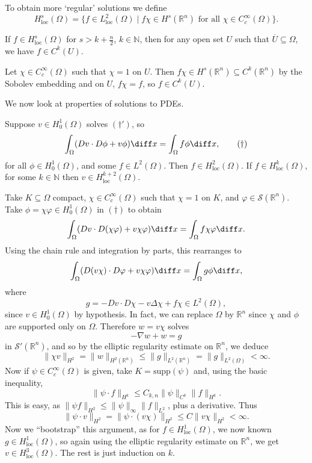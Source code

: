 \documentclass[12pt]{article}
\begin{document}
To obtain more `regular' solutions we define
\[
	H^s_{\mathrm{loc}}(\Omega) = \{f \in L^2_{\mathrm{loc}}(\Omega) \mid f \chi \in H^s(\mathbb{R}^n) \text{ for all } \chi \in C^\infty_c(\Omega)\}.
\]

\begin{proposition}
	If $f \in H^s_{\mathrm{loc}}(\Omega)$ for $s > k + \frac{n}{2}$, $k \in \mathbb{N}$, then for any open set $U$ such that $\overline{U} \subseteq \Omega$, we have $f \in C^k(U)$.
\end{proposition}

\begin{proofbox}
	Let $\chi \in C^\infty_c(\Omega)$ such that $\chi = 1$ on $U$. Then $f \chi \in H^s(\mathbb{R}^n) \subseteq C^k(\mathbb{R}^n)$ by the Sobolev embedding and on $U$, $f \chi = f$, so $f \in C^k(U)$.
\end{proofbox}

We now look at properties of solutions to PDEs.

\begin{theorem}
	Suppose $v \in H^1_0(\Omega)$ solves $(\dagger')$, so
	\[
		\int_{\Omega} (D v \cdot D \phi + v \phi) \diff x = \int_{\Omega} f \phi \diff x, \tag{$\dagger$}
	\]
	for all $\phi \in H^1_0(\Omega)$, and some $f \in L^2(\Omega)$. Then $f \in H^2_{\mathrm{loc}}(\Omega)$. If $f \in H^k_{\mathrm{loc}}(\Omega)$, for some $k \in \mathbb{N}$ then $v \in H^{k+2}_{\mathrm{loc}}(\Omega)$.
\end{theorem}

\begin{proofbox}
	Take $K \subseteq \Omega$ compact, $\chi \in C^\infty_c(\Omega)$ such that $\chi = 1$ on $K$, and $\varphi \in \mathcal{S}(\mathbb{R}^n)$. Take $\phi = \chi \varphi \in H^1_0(\Omega)$ in $(\dagger)$ to obtain
	\[
	\int_{\Omega}(Dv \cdot D(\chi \varphi) + v \chi \varphi) \diff x = \int_{\Omega} f \chi \varphi \diff x.
	\]
	Using the chain rule and integration by parts, this rearranges to
	\[
	\int_{\Omega}(D(v \chi) \cdot D \varphi + v \chi \varphi) \diff x = \int_{\Omega}g \phi \diff x,
	\]
	where
	\[
	g = - D v \cdot D \chi - v \Delta \chi + f \chi \in L^2(\Omega),
	\]
	since $v \in H^1_0(\Omega)$ by hypothesis. In fact, we can replace $\Omega$ by $\mathbb{R}^n$ since $\chi$ and $\phi$ are supported only on $\Omega$. Therefore $w = v \chi$ solves
	\[
	- \nabla w + w = g
	\]
	in $\mathcal{S}'(\mathbb{R}^n)$, and so by the elliptic regularity estimate on $\mathbb{R}^n$, we deduce
	\[
	\|\chi v\|_{H^2} = \|w\|_{H^2(\mathbb{R}^n)} \leq \|g\|_{L^2(\mathbb{R}^n)} = \|g\|_{L^2(\Omega)} < \infty.
	\]
	Now if $\psi \in C^\infty_c(\Omega)$ is given, take $K = \mathrm{supp}(\psi)$ and, using the basic inequality,
	\[
		\|\psi \cdot f\|_{H^k} \leq C_{k, n} \|\psi\|_{C^k} \|f\|_{H^k}.
	\]
	This is easy, as $\|\psi f\|_{H^2} \leq \|\psi\|_{\infty} \|f\|_{L^2}$, plus a derivative. Thus
	\[
	\|\psi \cdot v\|_{H^2} = \|\psi \cdot (v \chi)\|_{H^2} \leq C \|v \chi\|_{H^2} < \infty.
	\]
	Now we ``bootstrap'' this argument, as for $f \in H^1_{\mathrm{loc}}(\Omega)$, we now known $g \in H^1_{\mathrm{loc}}(\Omega)$, so again using the elliptic regularity estimate on $\mathbb{R}^n$, we get $v \in H^3_{\mathrm{loc}}(\Omega)$. The rest is just induction on $k$.
\end{proofbox}
\end{document}
